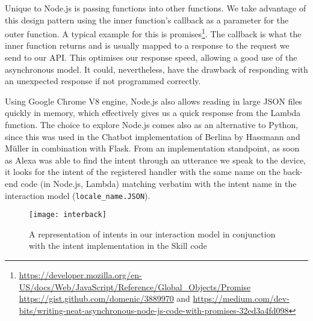 Unique to Node.js is passing functions into other functions. We take advantage of %
this design pattern using the inner function's callback as a parameter for the outer function. A typical example for this is %
promises\footnote{\url{https://developer.mozilla.org/en-US/docs/Web/JavaScript/Reference/Global_Objects/Promise} \\ \url{https://gist.github.com/domenic/3889970} and \url{https://medium.com/dev-bits/writing-neat-asynchronous-node-js-code-with-promises-32ed3a4fd098}}. The callback is what the inner function returns and is usually mapped to a response to the request we send to our API.
This optimises our response speed, allowing a good use of the asynchronous model. It could, nevertheless, have the drawback of responding with an unexpected response if not programmed correctly.

Using Google Chrome V8 engine, Node.js also allows reading in large JSON files quickly in memory, which effectively gives us a quick response from the Lambda function.
The choice to explore Node.js comes also as an alternative to Python, since this was used in the Chatbot implementation of Berlina by Hassmann and Müller \cite{hassmannMlr:berlina} in combination with Flask.
From an implementation standpoint, as soon as Alexa was able to find the intent through an utterance we speak to the device, it looks for the intent of the registered handler with the same name on the back-end code (in Node.js, Lambda) matching verbatim with the intent name in the interaction model (\texttt{locale_name.JSON}).





\begin{figure}[h!]
	\centering
	\caption[Interaction Model vs. Skill Code]{A representation of intents in our interaction model in conjunction with the intent implementation in the Skill code}
	\label{interactionModel:bild}
	\texttt{[image: interback]}
	
	
\end{figure}


